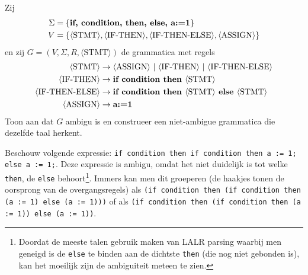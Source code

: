 \documentclass[a4paper]{article}
\newcommand{\rul}{\rightarrow}
\newcommand{\gvar}[1]{\langle \text{{#1}} \rangle}
\newcommand{\gend}[1]{\text{\bf{#1}}}
\begin{document}
\begin{question}
Zij 
\begin{align*}
  \Sigma & = \{ \gend{if, condition, then, else, a:=1} \} \\
  V & = \{ \gvar{STMT}, \gvar{IF-THEN}, \gvar{IF-THEN-ELSE}, \gvar{ASSIGN} \} \\
\end{align*}
  en zij $G = (V,\Sigma,R,\gvar{STMT})$ de grammatica met regels
  \begin{align*}                                                                               
      \gvar{STMT}          & \rul \gvar{ASSIGN} \ | \ \gvar{IF-THEN} \ | \ \gvar{IF-THEN-ELSE}  \\
      \gvar{IF-THEN}       & \rul \gend{if condition then } \gvar{STMT} \\
      \gvar{IF-THEN-ELSE}  & \rul \gend{if condition then } \gvar{STMT} \gend{ else } \gvar{STMT} \\
      \gvar{ASSIGN}        & \rul \gend{a:=1} \\
  \end{align*}
  Toon aan dat $G$ ambigu is en construeer een niet-ambigue grammatica die dezelfde taal herkent.
\begin{answer}
Beschouw volgende expressie: \texttt{if condition then if condition then a := 1; else a := 1;}. Deze expressie is ambigu, omdat het niet duidelijk is tot welke \texttt{then}, de \texttt{else} behoort\footnote{Doordat de meeste talen gebruik maken van LALR parsing waarbij men geneigd is de \texttt{else} te binden aan de dichtste \texttt{then} (die nog niet gebonden is), kan het moeilijk zijn de ambiguiteit meteen te zien.}. Immers kan men dit groeperen (de haakjes tonen de oorsprong van de overgangsregels) als \texttt{(if condition then (if condition then (a := 1) else (a := 1)))} of als \texttt{(if condition then (if condition then (a := 1)) else (a := 1))}.

\end{answer}
\end{question}
\end{document}
